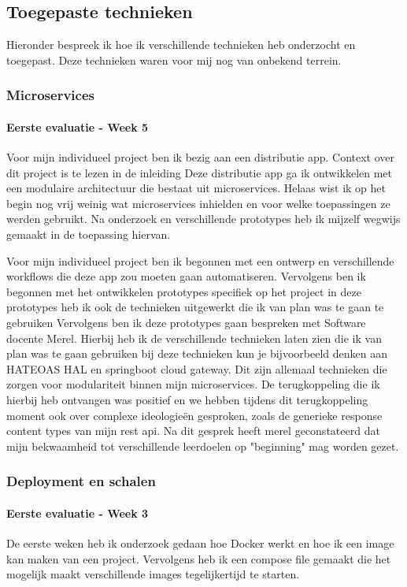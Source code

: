 \subsection{Toegepaste technieken}\label{subsec:toegepaste-technieken}
Hieronder bespreek ik hoe ik verschillende technieken heb onderzocht en toegepast.
Deze technieken waren voor mij nog van onbekend terrein.

\subsubsection{Microservices}
\paragraph{Eerste evaluatie - Week 5}
Voor mijn individueel project ben ik bezig aan een distributie app.
Context over dit project is te lezen in de inleiding
Deze distributie app ga ik ontwikkelen met een modulaire architectuur die bestaat uit microservices.
Helaas wist ik op het begin nog vrij weinig wat microservices inhielden en voor welke toepassingen ze werden gebruikt.
Na onderzoek en verschillende prototypes heb ik mijzelf wegwijs gemaakt in de toepassing hiervan.

Voor mijn individueel project ben ik begonnen met een ontwerp en verschillende workflows die deze app zou moeten gaan automatiseren.
Vervolgens ben ik begonnen met het ontwikkelen prototypes specifiek op het project in deze prototypes heb ik ook de technieken uitgewerkt die ik van plan was te gaan te gebruiken
Vervolgens ben ik deze prototypes gaan bespreken met Software docente Merel.
Hierbij heb ik de verschillende technieken laten zien die ik van plan was te gaan gebruiken bij deze technieken kun je bijvoorbeeld denken aan HATEOAS HAL en springboot cloud gateway.
Dit zijn allemaal technieken die zorgen voor modulariteit binnen mijn microservices.
De terugkoppeling die ik hierbij heb ontvangen was positief en we hebben tijdens dit terugkoppeling moment ook over complexe ideologieën gesproken, zoals de generieke response content types van mijn rest api.
Na dit gesprek heeft merel geconstateerd dat mijn bekwaamheid tot verschillende leerdoelen op "beginning" mag worden gezet.


\subsubsection{Deployment en schalen}
\paragraph{Eerste evaluatie - Week 3}
De eerste weken heb ik onderzoek gedaan hoe Docker werkt en hoe ik een image kan maken van een project.
Vervolgens heb ik een compose file gemaakt die het mogelijk maakt verschillende images tegelijkertijd te starten.

